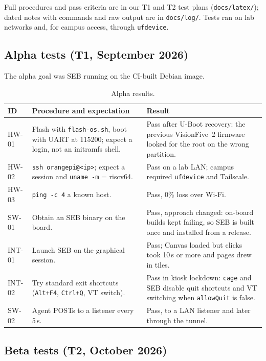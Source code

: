 \documentclass[11pt]{article}
\begin{document}
Full procedures and pass criteria are in our T1 and T2 test plans (\texttt{docs/latex/}); dated notes with commands and raw output are in \texttt{docs/log/}. Tests ran on lab networks and, for campus access, through \texttt{ufdevice}.

\subsection{Alpha tests (T1, September 2026)}
The alpha goal was SEB running on the CI-built Debian image.

\begin{table}[H]
\centering
\footnotesize
\begin{tabularx}{\textwidth}{@{}p{}p{}X@{}}
\toprule
\textbf{ID} & \textbf{Procedure and expectation} & \textbf{Result} \\
\midrule
HW-01 & Flash with \texttt{flash-os.sh}, boot with UART at 115200; expect a login, not an initramfs shell. & Pass after U-Boot recovery: the previous VisionFive~2 firmware looked for the root on the wrong partition. \\
HW-02 & \texttt{ssh orangepi@<ip>}; expect a session and \texttt{uname -m} = riscv64. & Pass on a lab LAN; campus required \texttt{ufdevice} and Tailscale. \\
HW-03 & \texttt{ping -c 4} a known host. & Pass, 0\% loss over Wi-Fi. \\
SW-01 & Obtain an SEB binary on the board. & Pass, approach changed: on-board builds kept failing, so SEB is built once and installed from a release. \\
INT-01 & Launch SEB on the graphical session. & Pass; Canvas loaded but clicks took 10\,s or more and pages drew in tiles. \\
INT-02 & Try standard exit shortcuts (\texttt{Alt+F4}, \texttt{Ctrl+Q}, VT switch). & Pass in kiosk lockdown: \texttt{cage} and SEB disable quit shortcuts and VT switching when \texttt{allowQuit} is false. \\
SW-02 & Agent POSTs to a listener every 5\,s. & Pass, to a LAN listener and later through the tunnel. \\
\bottomrule
\end{tabularx}
\caption{Alpha results.}
\end{table}

\subsection{Beta tests (T2, October 2026)}
\end{document}

